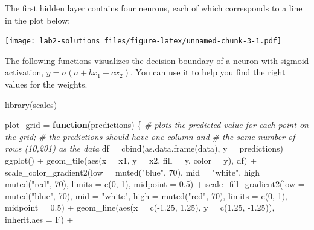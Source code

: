 \documentclass[
]{article}
\newenvironment{Shaded}{\begin{snugshade}}{\end{snugshade}}
\newcommand{\AttributeTok}[1]{\textcolor[rgb]{0.77,0.63,0.00}{#1}}
\newcommand{\CommentTok}[1]{\textcolor[rgb]{0.56,0.35,0.01}{\textit{#1}}}
\newcommand{\ControlFlowTok}[1]{\textcolor[rgb]{0.13,0.29,0.53}{\textbf{#1}}}
\newcommand{\DecValTok}[1]{\textcolor[rgb]{0.00,0.00,0.81}{#1}}
\newcommand{\FloatTok}[1]{\textcolor[rgb]{0.00,0.00,0.81}{#1}}
\newcommand{\FunctionTok}[1]{\textcolor[rgb]{0.00,0.00,0.00}{#1}}
\newcommand{\NormalTok}[1]{#1}
\newcommand{\OtherTok}[1]{\textcolor[rgb]{0.56,0.35,0.01}{#1}}
\newcommand{\SpecialCharTok}[1]{\textcolor[rgb]{0.00,0.00,0.00}{#1}}
\newcommand{\StringTok}[1]{\textcolor[rgb]{0.31,0.60,0.02}{#1}}
\begin{document}
The first hidden layer contains four neurons, each of which corresponds
to a line in the plot below:

\texttt{[image: lab2-solutions\_files/figure-latex/unnamed-chunk-3-1.pdf]}

The following functions visualizes the decision boundary of a neuron
with sigmoid activation, \(y=\sigma(a+bx_1+cx_2)\). You can use it to
help you find the right values for the weights.

\begin{Shaded}
\begin{Highlighting}[]
\FunctionTok{library}\NormalTok{(scales)}

\NormalTok{plot\_grid }\OtherTok{=} \ControlFlowTok{function}\NormalTok{(predictions) \{}
  \CommentTok{\# plots the predicted value for each point on the grid;}
  \CommentTok{\# the predictions should have one column and}
  \CommentTok{\# the same number of rows (10,201) as the data}
\NormalTok{  df }\OtherTok{=} \FunctionTok{cbind}\NormalTok{(}\FunctionTok{as.data.frame}\NormalTok{(data), }\AttributeTok{y =}\NormalTok{ predictions)}
  \FunctionTok{ggplot}\NormalTok{() }\SpecialCharTok{+}
    \FunctionTok{geom\_tile}\NormalTok{(}\FunctionTok{aes}\NormalTok{(}\AttributeTok{x =}\NormalTok{ x1, }\AttributeTok{y =}\NormalTok{ x2, }\AttributeTok{fill =}\NormalTok{ y, }\AttributeTok{color =}\NormalTok{ y), df) }\SpecialCharTok{+}
    \FunctionTok{scale\_color\_gradient2}\NormalTok{(}\AttributeTok{low =} \FunctionTok{muted}\NormalTok{(}\StringTok{"blue"}\NormalTok{, }\DecValTok{70}\NormalTok{), }\AttributeTok{mid =} \StringTok{"white"}\NormalTok{,}
                         \AttributeTok{high =} \FunctionTok{muted}\NormalTok{(}\StringTok{"red"}\NormalTok{, }\DecValTok{70}\NormalTok{), }\AttributeTok{limits =} \FunctionTok{c}\NormalTok{(}\DecValTok{0}\NormalTok{, }\DecValTok{1}\NormalTok{),}
                         \AttributeTok{midpoint =} \FloatTok{0.5}\NormalTok{) }\SpecialCharTok{+}
    \FunctionTok{scale\_fill\_gradient2}\NormalTok{(}\AttributeTok{low =} \FunctionTok{muted}\NormalTok{(}\StringTok{"blue"}\NormalTok{, }\DecValTok{70}\NormalTok{), }\AttributeTok{mid =} \StringTok{"white"}\NormalTok{,}
                        \AttributeTok{high =} \FunctionTok{muted}\NormalTok{(}\StringTok{"red"}\NormalTok{, }\DecValTok{70}\NormalTok{), }\AttributeTok{limits =} \FunctionTok{c}\NormalTok{(}\DecValTok{0}\NormalTok{, }\DecValTok{1}\NormalTok{),}
                        \AttributeTok{midpoint =} \FloatTok{0.5}\NormalTok{) }\SpecialCharTok{+}
    \FunctionTok{geom\_line}\NormalTok{(}\FunctionTok{aes}\NormalTok{(}\AttributeTok{x =} \FunctionTok{c}\NormalTok{(}\SpecialCharTok{{-}}\FloatTok{1.25}\NormalTok{, }\FloatTok{1.25}\NormalTok{), }\AttributeTok{y =} \FunctionTok{c}\NormalTok{(}\FloatTok{1.25}\NormalTok{, }\SpecialCharTok{{-}}\FloatTok{1.25}\NormalTok{)), }\AttributeTok{inherit.aes =}\NormalTok{ F) }\SpecialCharTok{+}

\end{Highlighting}
\end{Shaded}
\end{document}
